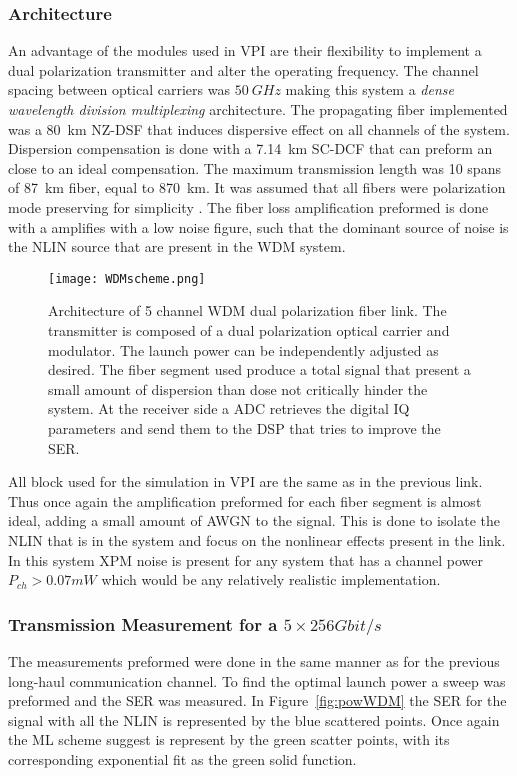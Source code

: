 \subsubsection{Architecture}

An advantage of the modules used in VPI are their flexibility to implement a dual polarization transmitter and  alter the operating frequency. The channel spacing between optical carriers was $50~GHz$ making this system a \textit{dense wavelength division multiplexing} architecture. The propagating fiber implemented was a 80~km NZ-DSF that induces dispersive effect on all channels of the system. Dispersion compensation is done with a 7.14~km SC-DCF that can preform an close to an ideal compensation. The maximum transmission length was 10 spans of 87~km fiber, equal to 870~km. It was assumed that all fibers were polarization mode preserving for simplicity . The fiber loss amplification preformed is done with a amplifies with a low noise figure, such that the dominant source of noise is the NLIN source that are present in the WDM system.  

    
\begin{figure}[H]
\centering
\texttt{[image: WDMscheme.png]}
\caption{Architecture of 5 channel WDM dual polarization fiber link. The transmitter is composed of a dual polarization optical carrier  and modulator. The launch power can be independently adjusted as desired. The fiber segment used produce a total signal that present a small amount of dispersion than dose not critically hinder the system. At the receiver side a ADC retrieves the digital IQ parameters and send them to the DSP that tries to improve the SER. }
\end{figure}

All block used for the simulation in VPI are the same as in the previous link. Thus once again the amplification preformed for each fiber segment is almost ideal, adding a small amount of AWGN to the signal. This is done to isolate the NLIN that is in the system and focus on the nonlinear effects present in the link. In this system XPM noise is present for any system that has a channel power $P_{ch}>0.07mW$ which would be any relatively realistic implementation. 


\subsubsection{Transmission Measurement for a $5\times 256 Gbit/s $}
 The measurements preformed were done in the same manner as for the previous long-haul communication channel. To find the optimal launch power a sweep was preformed and the SER was measured. In Figure~\ref{fig:powWDM} the SER for the signal with all the NLIN is represented by the blue scattered points. Once again the ML scheme suggest is represent by the green scatter points, with its corresponding exponential fit as the green solid function. 
 
